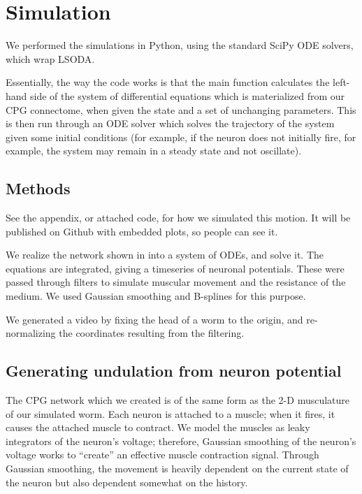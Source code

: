 \documentclass[
    11pt,
]{article}
\begin{document}
\section{Simulation}

We performed the simulations in Python, using the standard SciPy ODE solvers, which wrap LSODA. %

Essentially, the way the code works is that the main function calculates the left-hand side of the system of differential equations which is materialized from our CPG connectome, when given the state and a set of unchanging parameters.  This is then run through an ODE solver which solves the trajectory of the system given some initial conditions (for example, if the neuron does not initially fire, for example, the system may remain in a steady state and not oscillate).

\subsection{Methods}

See the appendix, or attached code, for how we simulated this motion.  It will be published on Github with embedded plots, so people can see it.

We realize the network shown in  into a system of ODEs, and solve it.  The equations are integrated, giving a timeseries of neuronal potentials.  These were passed through filters to simulate muscular movement and the resistance of the medium.  We used Gaussian smoothing and B-splines for this purpose.

We generated a video by fixing the head of a worm to the origin, and re-normalizing the coordinates resulting from the filtering.

\subsection{Generating undulation from neuron potential}

The CPG network which we created is of the same form as the 2-D musculature of our simulated worm.  Each neuron is attached to a muscle; when it fires, it causes the attached muscle to contract.  We model the muscles as leaky integrators of the neuron's voltage; therefore, Gaussian smoothing of the neuron's voltage works to ``create'' an effective muscle contraction signal.  Through Gaussian smoothing, the movement is heavily dependent on the current state of the neuron but also dependent somewhat on the history. 
\end{document}
